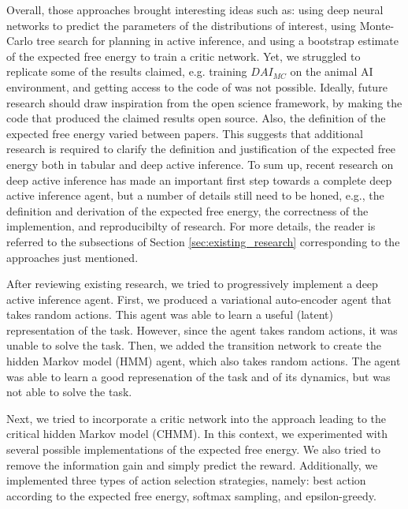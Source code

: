 \documentclass[twoside,11pt]{article}
\begin{document}
Overall, those approaches brought interesting ideas such as: using deep neural networks to predict the parameters of the distributions of interest, using Monte-Carlo tree search for planning in active inference, and using a bootstrap estimate of the expected free energy to train a critic network. Yet, we struggled to replicate some of the results claimed, e.g. training $DAI_{MC}$ on the animal AI environment, and getting access to the code of \citet{schneider2022active} was not possible. Ideally, future research should draw inspiration from the open science framework, by making the code that produced the claimed results open source. Also, the definition of the expected free energy varied between papers. This suggests that additional research is required to clarify the definition and justification of the expected free energy both in tabular and deep active inference. To sum up, recent research on deep active inference \citep{DeepAIwithMCMC,DeepAI,rood2020deep,sancaktar2020endtoend,DAI_Kai,DAI_POMDP,ccatal2020learning} has made an important first step towards a complete deep active inference agent, but a number of details still need to be honed, e.g., the definition and derivation of the expected free energy, the correctness of the implemention, and reproducibilty of research. For more details, the reader is referred to the subsections of Section \ref{sec:existing_research} corresponding to the approaches just mentioned.

After reviewing existing research, we tried to progressively implement a deep active inference agent. First, we produced a variational auto-encoder agent that takes random actions. This agent was able to learn a useful (latent) representation of the task. However, since the agent takes random actions, it was unable to solve the task. Then, we added the transition network to create the hidden Markov model (HMM) agent, which also takes random actions. The agent was able to learn a good represenation of the task and of its dynamics, but was not able to solve the task.

Next, we tried to incorporate a critic network into the approach leading to the critical hidden Markov model (CHMM). In this context, we experimented with several possible implementations of the expected free energy. We also tried to remove the information gain and simply predict the reward. Additionally, we implemented three types of action selection strategies, namely: best action according to the expected free energy, softmax sampling, and epsilon-greedy.
\end{document}
